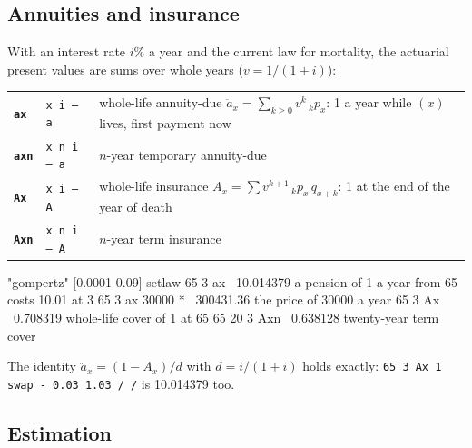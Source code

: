 \documentclass[11pt,letterpaper]{article}
\newcommand{\code}[1]{\texttt{#1}}
\newcommand{\cmd}[1]{\texttt{\textbf{#1}}}
\newcommand{\stk}[1]{\texttt{#1}}
\begin{document}
\subsection{Annuities and insurance}

With an interest rate $i\%$ a year and the current law for mortality, the actuarial present values are sums over whole years ($v = 1/(1+i)$):
\begin{center}
\begin{tabular}{@{}l>{\raggedright\arraybackslash}p{}>{\raggedright\arraybackslash}p{}@{}}
\toprule
\cmd{ax} & \stk{x i -- a} & whole-life annuity-due $\ddot a_x = \sum_{k\ge 0} v^k\,{}_kp_x$: 1 a year while $(x)$ lives, first payment now \\
\cmd{axn} & \stk{x n i -- a} & $n$-year temporary annuity-due \\
\cmd{Ax} & \stk{x i -- A} & whole-life insurance $A_x = \sum v^{k+1}\,{}_kp_x\,q_{x+k}$: 1 at the end of the year of death \\
\cmd{Axn} & \stk{x n i -- A} & $n$-year term insurance \\
\bottomrule
\end{tabular}
\end{center}
\begin{rpn}
"gompertz" [0.0001 0.09] setlaw
65 3 ax                     \ 10.014379  a pension of 1 a year from 65 costs 10.01 at 3%
65 3 ax 30000 *             \ 300431.36  the price of 30000 a year
65 3 Ax                     \ 0.708319   whole-life cover of 1 at 65
65 20 3 Axn                 \ 0.638128   twenty-year term cover
\end{rpn}
The identity $\ddot a_x = (1 - A_x)/d$ with $d = i/(1+i)$ holds exactly: \code{65 3 Ax 1 swap - 0.03 1.03 / /} is 10.014379 too.

\subsection{Estimation}
\end{document}
